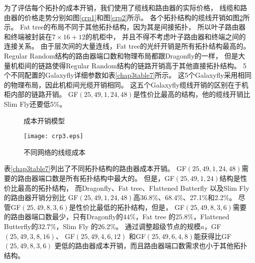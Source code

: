 为了评估每个拓扑的成本开销，我们使用了缆线和路由器的实际价格，
线缆和路由器的价格走势分别如图\ref{crp1}和图\ref{crp2}所示。
各个拓扑结构的缆线开销如图\ref{crp3}所示。
Fat tree的布局不同于其他拓扑结构，因为其是间接拓扑，
所以叶子路由器和终端被封装在$7\times 16+12$的机柜中，
并且不得不考虑叶子路由器和终端之间的连接关系。
由于层次间的大量连线，Fat tree的光纤开销是所有拓扑结构最高的。
Regular Random结构的路由器端口数和物理布局都跟Dragonfly的一样，
但是大量机柜间的链路使得Regular Random结构的链路开销高于其他直接拓扑结构。
5个不同配置的Galaxyfly详细参数如表\ref{chap3table7}所示。
这5个Galaxyfly采用相同的物理布局，因此机柜间光缆开销相同。
这五个Galaxyfly缆线开销的区别在于机柜内部的链路开销。
GF$(25,49,1,24,48)$是性价比最高的结构，他的缆线开销比Slim Fly还要低5\%。

\begin{figure}
  \centering
  \begin{minipage}[t]{\textwidth}
   \centering
  \caption{成本开销模型}
  \label{fig:Figure15}
  \end{minipage}
\end{figure}
\begin{figure}
  \centering
  \texttt{[image: crp3.eps]}
  \caption{不同网络的线缆成本}
  \label{crp3}
\end{figure}

表\ref{chap3table7}列出了不同拓扑结构的路由器成本开销。
GF$(25,49,1,24,48)$需要的路由器端口数是所有拓扑结构中最大的。
但是，GF$(25,49,1,24)$结构是性价比最高的拓扑结构，
而Dragonfly、Fat tree、Flattened Butterfly 以及Slim Fly的路由器开销分别比
GF$(25,49,1,24,48)$高36.8\%、68.4\%、27.1\%和2.2\%。
尽管GF$(25,49,8,3,6)$是性价比最低的拓扑结构，但是，
GF$(25,49,8,3,6)$需要的路由器端口数最少，只有Dragonfly的$44\%$，Fat tree
的$25.8\%$，Flattened Butterfly的$32.7\%$，Slim Fly 的$26.2\%$。
通过调整超级节点的规模$a$，GF$(25,49,3,8,16)$、
GF$(25,49,4,6,12)$ 和GF$(25,49,6,4,8)$能获得比GF$(25,49,8,3,6)$
更低的路由器成本开销，而且路由器端口数需求也小于其他拓扑结构。


